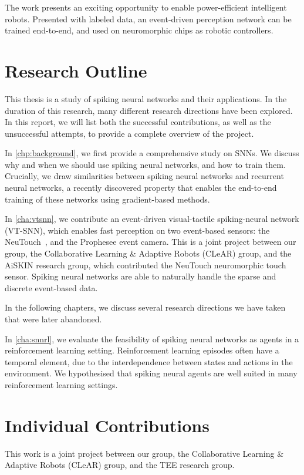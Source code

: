 \documentclass[fyp]{socreport}
\begin{document}
The work presents an exciting opportunity to enable power-efficient intelligent
robots. Presented with labeled data, an event-driven perception network can be
trained end-to-end, and used on neuromorphic chips as robotic controllers.

\section{Research Outline}

This thesis is a study of spiking neural networks and their applications. In the
duration of this research, many different research directions have been
explored. In this report, we will list both the successful contributions, as
well as the unsuccessful attempts, to provide a complete overview of the project.

In \autoref{chp:background}, we first provide a comprehensive study on SNNs. We
discuss why and when we should use spiking neural networks, and how to train
them. Crucially, we draw similarities between spiking neural networks and
recurrent neural networks, a recently discovered property that enables the
end-to-end training of these networks using gradient-based methods.

In \autoref{cha:vtsnn}, we contribute an event-driven visual-tactile
spiking-neural network (VT-SNN), which enables fast perception on two
event-based sensors: the NeuTouch~\cite{aiskinLee}, and the Prophesee event
camera. This is a joint project between our group, the Collaborative Learning \&
Adaptive Robots (CLeAR) group, and the AiSKIN research group, which contributed
the NeuTouch neuromorphic touch sensor. Spiking neural networks are able to
naturally handle the sparse and discrete event-based data.

In the following chapters, we discuss several research directions we have taken
that were later abandoned.

In \autoref{cha:snnrl}, we evaluate the feasibility of spiking neural networks
as agents in a reinforcement learning setting. Reinforcement learning episodes
often have a temporal element, due to the interdependence between states and
actions in the environment. We hypothesised that spiking neural agents are well
suited in many reinforcement learning settings.

\section{Individual Contributions}
This work is a joint project between our group, the Collaborative Learning \&
Adaptive Robots (CLeAR) group, and the TEE research group.
\end{document}
